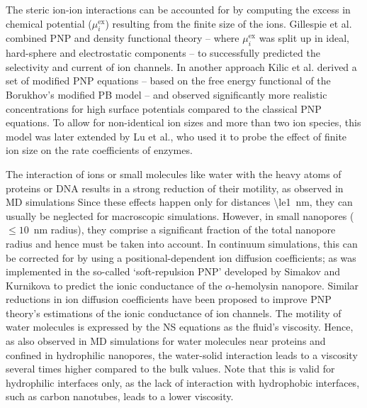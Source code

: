 \documentclass[journal=ancac3,manuscript=article,etalmode=truncate,maxauthors=0,layout=twocolumn]{achemso}
\begin{document}
The steric ion-ion interactions can be accounted for by computing the excess in chemical potential
($\mu_{i}^\text{ex}$) resulting from the finite size of the ions.\cite{Eisenberg-1996,Bazant-2009,
Daiguji-2010} Gillespie et al. combined PNP and density functional theory -- where $\mu_{i}^\text{ex}$ was
split up in ideal, hard-sphere and electrostatic components -- to successfully predicted the selectivity and
current of ion channels.\cite{Gillespie-2002} In another approach Kilic et al. derived a set of modified PNP
equations -- based on the free energy functional of the Borukhov's modified PB model\cite{Borukhov-1997} --
and observed significantly more realistic concentrations for high surface potentials compared to the classical
PNP equations.\cite{Kilic-2007} To allow for non-identical ion sizes and more than two ion species, this model
was later extended by Lu et al., who used it to probe the effect of finite ion size on the rate coefficients
of enzymes.\cite{Lu-2011}

The interaction of ions or small molecules like water with the heavy atoms of proteins or DNA results in a
strong reduction of their motility, as observed in MD simulations\cite{Makarov-1998,Pronk-2014} Since these
effects happen only for distances \SI{\le1}{\nm}, they can usually be neglected for macroscopic simulations.
However, in small nanopores ($\le10$~nm radius), they comprise a significant fraction of the total nanopore
radius and hence must be taken into account.\cite{Noskov-2004,Simakov-2010,Pederson-2015,McMullen-2017} In
continuum simulations, this can be corrected for by using a positional-dependent ion diffusion coefficients;
as was implemented in the so-called `soft-repulsion PNP' developed by Simakov and Kurnikova\cite{Simakov-2010,
Simakov-2018} to predict the ionic conductance of the $\alpha$-hemolysin nanopore. Similar reductions in ion
diffusion coefficients have been proposed to improve PNP theory's estimations of the ionic conductance of ion
channels.\cite{Furini-2006,Liu-2015} The motility of water molecules is expressed by the NS equations as the
fluid's viscosity. Hence, as also observed in MD simulations for water molecules near
proteins\cite{Pronk-2014} and confined in hydrophilic nanopores,\cite{Qiao_Aluru-2003,Vo-2016,Hsu-2017} the
water-solid interaction leads to a viscosity several times higher compared to the bulk values. Note that this
is valid for hydrophilic interfaces only, as the lack of interaction with hydrophobic interfaces, such as
carbon nanotubes, leads to a lower viscosity.\cite{Ye-2011}
\end{document}
